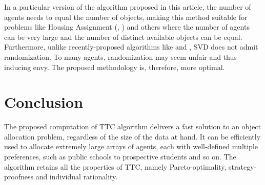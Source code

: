 In a particular version of the algorithm proposed in this article, the number of agents needs to equal the number of objects, making this method suitable for problems like Housing Assignment (\cite{ABDULKADIROGLU1998}, \cite{AbdulkadirogluSonmez2003}) and others where the number of agents can be very large and the number of distinct available objects can be equal. Furthermore, unlike recently-proposed algorithms like \cite{BogomolnaiaMoulin2004} and \cite{BOGOMOLNAIA2001295}, SVD does not admit randomization. To many agents, randomization may seem unfair and thus inducing envy. The proposed methodology is, therefore, more optimal.   


\section{Conclusion}
\textbf{}
The proposed computation of TTC algorithm delivers a fast solution to an object allocation problem, regardless of the size of the data at hand. It can be efficiently used to allocate extremely large arrays of agents, each with well-defined multiple preferences, such as public schools to prospective students and so on. The algorithm retains all the properties of TTC, namely Pareto-optimality, strategy-proofness and individual rationality. 




